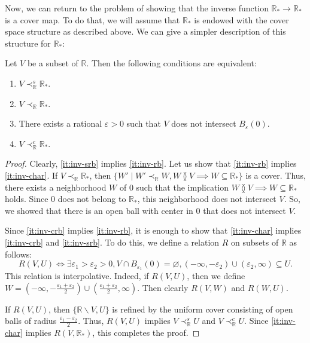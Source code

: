 \documentclass[reqno]{amsart}
\theoremstyle{definition}
\theoremstyle{remark}
\numberwithin{figure}{section}
\newcommand{\overlap}[2]{#1 \between #2}
\newcommand{\rb}{\prec}
\begin{document}
Now, we can return to the problem of showing that the inverse function $\mathbb{R}_* \to \mathbb{R}_*$ is a cover map.
To do that, we will assume that $\mathbb{R}_*$ is endowed with the cover space structure as described above.
We can give a simpler description of this structure for $\mathbb{R}_*$:

\begin{lem}
Let $V$ be a subset of $\mathbb{R}$.
Then the following conditions are equivalent:
\begin{enumerate}
\item \label{it:inv-srb} $V \rb^s_\mathbb{R} \mathbb{R}_*$.
\item \label{it:inv-rb} $V \rb_\mathbb{R} \mathbb{R}_*$.
\item \label{it:inv-char} There exists a rational $\varepsilon > 0$ such that $V$ does not intersect $B_\varepsilon(0)$.
\item \label{it:inv-crb} $V \rb^c_\mathbb{R} \mathbb{R}_*$.
\end{enumerate}
\end{lem}
\begin{proof}
Clearly, \eqref{it:inv-srb} implies \eqref{it:inv-rb}.
Let us show that \eqref{it:inv-rb} implies \eqref{it:inv-char}.
If $V \rb_\mathbb{R} \mathbb{R}_*$, then $\{ W' \mid W' \rb_\mathbb{R} W, \overlap{W}{V} \implies W \subseteq \mathbb{R}_* \}$ is a cover.
Thus, there exists a neighborhood $W$ of $0$ such that the implication $\overlap{W}{V} \implies W \subseteq \mathbb{R}_*$ holds.
Since $0$ does not belong to $\mathbb{R}_*$, this neighborhood does not intersect $V$.
So, we showed that there is an open ball with center in $0$ that does not intersect $V$.

Since \eqref{it:inv-crb} implies \eqref{it:inv-rb}, it is enough to show that \eqref{it:inv-char} implies \eqref{it:inv-crb} and \eqref{it:inv-srb}.
To do this, we define a relation $R$ on subsets of $\mathbb{R}$ as follows:
\[ R(V,U) \Leftrightarrow \exists \varepsilon_1 > \varepsilon_2 > 0, V \cap B_{\varepsilon_1}(0) = \varnothing, (- \infty, - \varepsilon_2) \cup (\varepsilon_2, \infty) \subseteq U. \]
This relation is interpolative.
Indeed, if $R(V,U)$, then we define $W = (- \infty, - \frac{\varepsilon_1 + \varepsilon_2}{2}) \cup (\frac{\varepsilon_1 + \varepsilon_2}{2}, \infty)$.
Then clearly $R(V,W)$ and $R(W,U)$.

If $R(V,U)$, then $\{ \mathbb{R} \backslash V, U \}$ is refined by the uniform cover consisting of open balls of radius $\frac{\varepsilon_1 - \varepsilon_2}{2}$.
Thus, $R(V,U)$ implies $V \rb^s_\mathbb{R} U$ and $V \rb^c_\mathbb{R} U$.
Since \eqref{it:inv-char} implies $R(V,\mathbb{R}_*)$, this completes the proof.
\end{proof}
\end{document}
